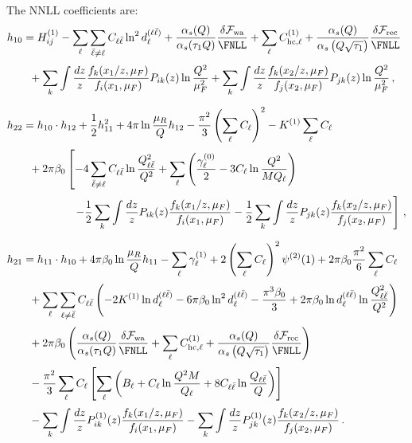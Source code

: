 The NNLL coefficients are:
\begin{subequations}
\begin{align}
\label{eq:h10}
&h_{10}= H_{ij}^{(1)}-\sum_{\ell}\sum_{\bar\ell\neq\ell} C_{\ell\bar\ell}\ln^2 d_\ell^{(\ell\bar\ell)}+\frac{\alpha_s(Q)}{\alpha_s(\tau_1 Q)}\frac{\delta\mathcal{F}_{\rm wa}}{\FNLL}+ \sum_{\ell}C_{\mathrm{hc},\ell}^{(1)}+\frac{\alpha_s(Q)}{\alpha_s\left(Q\sqrt{\tau_1}\right)}\frac{\delta\mathcal{F}_{\rm rec}}{\FNLL}\notag\\[0.5ex]
&\qquad +\sum_{k}\int\frac{dz}{z}\frac{f_k(x_1/z,\mu_F)}{f_i(x_1,\mu_F)} P_{ik}(z)\ln\frac{Q^2}{\mu_F^2}
+\sum_{k}\int\frac{dz}{z}\frac{f_k(x_2/z,\mu_F)}{f_j(x_2,\mu_F)} P_{jk}(z)\ln\frac{Q^2}{\mu_F^2}\,,\\[1.5ex]
\label{eq:h22}
&h_{22}=h_{10}\cdot h_{12}+\frac{1}{2}h_{11}^2+4\pi\ln\frac{\mu_R}{Q}h_{12}-\frac{\pi^2}{3}\left(\sum_{\ell}C_{\ell}\right)^2 -K^{(1)}\sum_{\ell}C_{\ell} \notag\\[0.5ex]
&\qquad+2\pi\beta_0\left[-4\sum_{\bar\ell\neq\ell}C_{\ell\bar\ell}\ln\frac{Q_{\ell\bar\ell}^2}{Q^2}
+\sum_{\ell}\left(\frac{\gamma_\ell^{(0)}}{2}-3C_\ell \ln\frac{Q^2}{M Q_{\ell}}\right)\right. \notag \\[0.5ex]
&\qquad\qquad\qquad\left. -\frac{1}{2}\sum_{k}\int\frac{dz}{z}P_{ik}(z)\frac{f_k(x_1/z,\mu_F)}{f_i(x_1,\mu_F)}-\frac{1}{2}\sum_{k}\int\frac{dz}{z}P_{jk}(z)\frac{f_k(x_2/z,\mu_F)}{f_j(x_2,\mu_F)}\right]\,,\\[1.5ex]
\label{eq:h21}
&h_{21}=h_{11}\cdot h_{10}+4\pi\beta_0\ln\frac{\mu_R}{Q}h_{11}-\sum_{\ell}\gamma_{\ell}^{(1)}+ 2\left(\sum_{\ell}C_{\ell}\right)^2\psi^{(2)}(1)+2\pi\beta_0\frac{\pi^2}{6}\sum_{\ell}C_{\ell} \notag\\[0.5ex]
&\qquad+\sum_{\ell}\sum_{\ell\neq \bar{\ell}} C_{\ell\bar{\ell}}\left(-2K^{(1)} \ln d_\ell^{(\ell\bar{\ell})}
  - 6\pi\beta_0 \ln^2 d_\ell^{(\ell\bar{\ell})} - \frac{\pi^3\beta_0}{3}+2 \pi\beta_0 \ln d_\ell^{(\ell\bar{\ell})}
 \ln\frac{Q_{\ell\bar{\ell}}^2}{Q^2}\right) \notag \\[0.5ex]
 &\qquad+2\pi\beta_0\left(\frac{\alpha_s(Q)}{\alpha_s(\tau_1 Q)}\frac{\delta\mathcal{F}_{\rm wa}}{\FNLL}+ \sum_{\ell}C_{\mathrm{hc},\ell}^{(1)}+\frac{\alpha_s(Q)}{\alpha_s\left(Q\sqrt{\tau_1}\right)}\frac{\delta\mathcal{F}_{\rm rec}}{\FNLL}\right)\notag\\[0.5ex]
&\qquad-\frac{\pi^2}{3} \sum_{\ell}C_{\ell}\left[\sum_{\ell}\left(B_{\ell}+C_{\ell}\ln\frac{Q^2 M}{Q_{\ell}}+ 8C_{\ell\bar\ell}\ln \frac{Q_{\ell\bar\ell}}{Q}\right) \right]\notag\\[0.5ex]
&\qquad-\sum_{k}\int\frac{dz}{z}P^{(1)}_{ik}(z)\frac{f_k(x_1/z,\mu_F)}{f_i(x_1,\mu_F)}-\sum_{k}\int\frac{dz}{z}P^{(1)}_{jk}(z)\frac{f_k(x_2/z,\mu_F)}{f_j(x_2,\mu_F)}\,.
\end{align}
\end{subequations}


